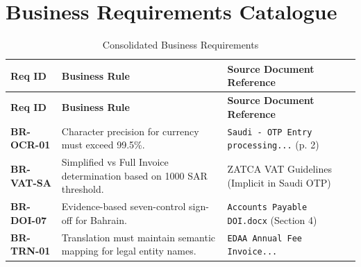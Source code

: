 \chapter{Business Requirements Catalogue}
\label{ch:requirements}

\begin{longtable}{p{2cm} p{5cm} p{7cm}}
\caption{Consolidated Business Requirements} \\
\toprule
\textbf{Req ID} & \textbf{Business Rule} & \textbf{Source Document Reference} \\
\midrule
\endfirsthead
\toprule
\textbf{Req ID} & \textbf{Business Rule} & \textbf{Source Document Reference} \\
\midrule
\endhead
\rowcolor{sapblue!5}
\textbf{BR-OCR-01} & Character precision for currency must exceed 99.5\%. & \texttt{Saudi - OTP Entry processing...} (p. 2) \\
\textbf{BR-VAT-SA} & Simplified vs Full Invoice determination based on 1000 SAR threshold. & ZATCA VAT Guidelines (Implicit in Saudi OTP) \\
\rowcolor{sapblue!5}
\textbf{BR-DOI-07} & Evidence-based seven-control sign-off for Bahrain. & \texttt{Accounts Payable DOI.docx} (Section 4) \\
\textbf{BR-TRN-01} & Translation must maintain semantic mapping for legal entity names. & \texttt{EDAA Annual Fee Invoice...} \\
\bottomrule
\end{longtable}
